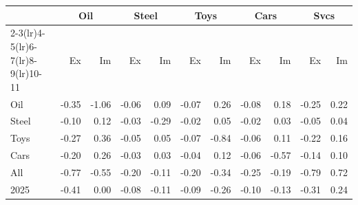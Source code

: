 \begin{tabular}{lrrrrrrrrrr}
\toprule
 & \multicolumn{2}{c}{Oil} & \multicolumn{2}{c}{Steel} & \multicolumn{2}{c}{Toys} & \multicolumn{2}{c}{Cars} & \multicolumn{2}{c}{Svcs} \\
\cmidrule(lr){2-3}\cmidrule(lr){4-5}\cmidrule(lr){6-7}\cmidrule(lr){8-9}\cmidrule(lr){10-11}
 & Ex & Im & Ex & Im & Ex & Im & Ex & Im & Ex & Im \\
\midrule
Oil & -0.35 & -1.06 & -0.06 & 0.09 & -0.07 & 0.26 & -0.08 & 0.18 & -0.25 & 0.22 \\
Steel & -0.10 & 0.12 & -0.03 & -0.29 & -0.02 & 0.05 & -0.02 & 0.03 & -0.05 & 0.04 \\
Toys & -0.27 & 0.36 & -0.05 & 0.05 & -0.07 & -0.84 & -0.06 & 0.11 & -0.22 & 0.16 \\
Cars & -0.20 & 0.26 & -0.03 & 0.03 & -0.04 & 0.12 & -0.06 & -0.57 & -0.14 & 0.10 \\
All & -0.77 & -0.55 & -0.20 & -0.11 & -0.20 & -0.34 & -0.25 & -0.19 & -0.79 & 0.72 \\
2025 & -0.41 & 0.00 & -0.08 & -0.11 & -0.09 & -0.26 & -0.10 & -0.13 & -0.31 & 0.24 \\
\bottomrule
\end{tabular}
